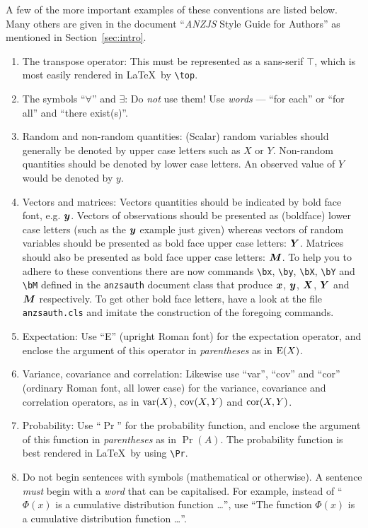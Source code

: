\documentclass[times, doublespace]{anzsauth}
\begin{document}
A few of the more important examples of these conventions are
listed below.  Many others are given in the document ``\textit{ANZJS}
Style Guide for Authors'' as mentioned in Section~\ref{sec:intro}.
\begin{enumerate}
\item The transpose operator:  This must be represented as a
sans-serif $\top$, which is most easily rendered in \LaTeX\
by \verb!\top!.
\item The symbols ``$\forall$'' and $\exists$: Do \emph{not}
use them!  Use \emph{words} --- ``for each'' or ``for all'' and
``there exist(s)''.
\item Random and non-random quantities:  (Scalar) random variables
should generally be denoted by upper case letters such as $X$ or $Y$.
Non-random quantities should be denoted by lower case letters. An
observed value of $Y$ would be denoted by $y$.
\item Vectors and matrices:  Vectors quantities should be indicated
by bold face font, e.g. $\mbox{$\boldsymbol{y}$}$.  Vectors of observations should
be presented as (boldface) lower case letters (such as the $\mbox{$\boldsymbol{y}$}$
example just given) whereas vectors of random variables should be
presented as bold face upper case letters: $\mbox{$\boldsymbol{Y}$}$.  Matrices should
also be presented as bold face upper case letters: $\mbox{$\boldsymbol{M}$}$.  To help
you to adhere to these conventions there are now commands \verb!\bx!,
\verb!\by!, \verb!\bX!, \verb!\bY!  and \verb!\bM! defined in the
\texttt{anzsauth} document class that produce $\mbox{$\boldsymbol{x}$}$, $\mbox{$\boldsymbol{y}$}$, $\mbox{$\boldsymbol{X}$}$,
$\mbox{$\boldsymbol{Y}$}$ and $\mbox{$\boldsymbol{M}$}$ respectively.  To get other bold face letters,
have a look at the file \texttt{anzsauth.cls} and imitate the
construction of the foregoing commands.

\item Expectation:  Use ``E'' (upright Roman font) for the
expectation operator, and enclose the argument of this operator in
\emph{parentheses} as in $\mbox{$\textrm{\textup{E}}$}(X)$. \label{op:expect}

\item Variance, covariance and correlation:  Likewise use ``var'',
``cov'' and ``cor'' (ordinary Roman font, all lower case) for the
variance, covariance and correlation operators, as in $\mbox{$\textrm{\textup{var}}$}(X)$,
$\mbox{$\textrm{\textup{cov}}$}(X,Y)$ and $\mbox{$\textrm{\textup{cor}}$}(X,Y)$. \label{op:var}

\item Probability: Use ``$\Pr$'' for the probability function,
and enclose the argument of this function in \emph{parentheses}
as in $\Pr(A)$.  The probability function is best rendered
in \LaTeX\ by using \verb!\Pr!.

\item Do not begin sentences with symbols (mathematical or
otherwise).  A sentence \emph{must} begin with a \emph{word}
that can be capitalised. For example, instead of ``$\Phi(x)$ is
a cumulative distribution function \ldots'', use ``The function
$\Phi(x)$ is a cumulative distribution function \ldots''.
\end{enumerate}
\end{document}
